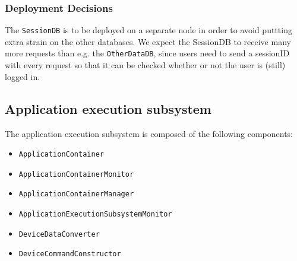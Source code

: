         \subsubsection*{Deployment Decisions}
            The \texttt{SessionDB} is to be deployed on a separate node in order to avoid puttting extra strain on the other databases.
            We expect the SessionDB to receive many more requests than e.g. the \texttt{OtherDataDB}, since users need to send a sessionID
            with every request so that it can be checked whether or not the user is (still) logged in.


    \subsection{Application execution subsystem}
        The application execution subsystem is composed of the following components:
        \begin{itemize}
            \item \texttt{ApplicationContainer}
            \item \texttt{ApplicationContainerMonitor}
            \item \texttt{ApplicationContainerManager}
            \item \texttt{ApplicationExecutionSubsystemMonitor}
            \item \texttt{DeviceDataConverter}
            \item \texttt{DeviceCommandConstructor}
        \end{itemize}

